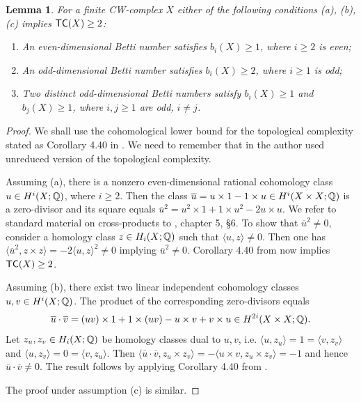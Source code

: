 \documentclass[10pt,a4paper]{amsart}
\newtheorem{lema}{Lemma}
\newcommand{\tc}{{\sf{TC}}}
\begin{document}
\begin{lema}\label{lm:tc2}
For a finite CW-complex $X$ either of the following conditions (a), (b), (c) implies $\tc(X)\ge 2$:
\begin{enumerate}
\item[{(a)}] An even-dimensional Betti number satisfies $b_i(X)\ge 1$, where $i\ge 2$ is even;
\item[{(b)}] An odd-dimensional Betti number satisfies $b_i(X)\ge 2$, where $i\ge 1$ is odd;
\item[{(c)}]  Two distinct odd-dimensional Betti numbers satisfy $b_i(X)\ge 1$ and $b_j(X)\ge 1$, where $i, j\ge 1$ are odd, $i\not=j$. 
\end{enumerate}
\end{lema}
\begin{proof}
We shall use the cohomological lower bound for the topological complexity stated as Corollary 4.40 in \cite{Far2}. We need to remember that in \cite{Far2}  the author used unreduced version of the topological complexity. 

Assuming (a), there is a nonzero even-dimensional rational cohomology class $u\in H^i(X;\Bbb Q)$, where $i\ge 2$. Then the class 
$\overline u= u\times 1-1\times u\in H^i(X\times X;\Bbb Q)$ is a zero-divisor and its square equals  
$\overline u^2=u^2\times 1+1\times u^2 -2u\times u.$ 
We refer to standard material on cross-products to \cite{S}, chapter 5, \S 6. 
To show that $\overline u^2\not=0$, consider a homology class $z\in H_i(X;\Bbb Q)$ such that 
$\langle u, z\rangle \not=0$. Then one has $\langle \overline u^2, z\times z\rangle = -2 \langle u, z\rangle^2\not=0$ implying $\overline u^2\not=0$. 
Corollary 4.40 from \cite{Far2} now implies $\tc(X)\ge 2$. 

Assuming (b), there exist two linear independent cohomology classes $u, v\in H^i(X;\Bbb Q)$. The product of the corresponding zero-divisors equals
$$
\overline u\cdot \overline v = (uv)\times 1+1\times (uv) -u\times v+v\times u \in H^{2i}(X\times X;\Bbb Q).
$$
Let $z_u, z_v\in H_i(X;\Bbb Q)$ be homology classes dual to $u, v$, i.e. $\langle u, z_u\rangle =1=\langle v, z_v\rangle$ and $\langle u, z_v\rangle=0=\langle v, z_u\rangle$. Then 
$\langle \overline u\cdot \overline v, z_u\times z_v\rangle =- \langle u\times v, z_u\times z_v\rangle = - 1$ and hence $\overline u\cdot \overline v\not=0$. 
The result follows by applying Corollary 4.40 from \cite{Far2}. 

The proof under assumption (c) is similar. 
\end{proof}
\end{document}
